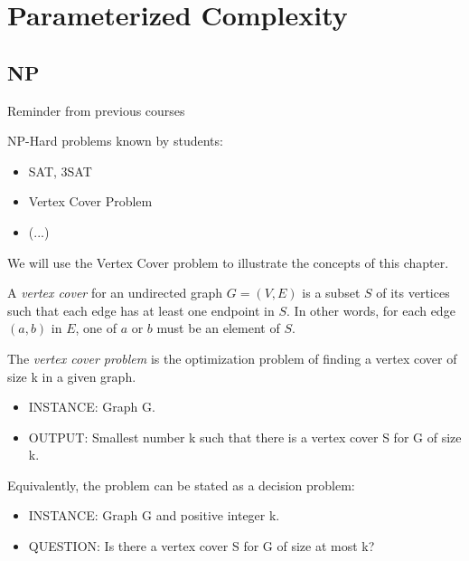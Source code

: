 
\chapter{Parameterized Complexity}
\label{cha:param-compl}



\section{NP}
\label{sec:np}

Reminder from previous courses


NP-Hard problems known by students:
\begin{itemize}
\item SAT, 3SAT

\item Vertex Cover Problem

\item (...)

\end{itemize}



We will use the Vertex Cover problem to illustrate the concepts of
this chapter.

\begin{definition}
  A \emph{vertex cover} for an undirected graph $G = (V,E)$ is a
  subset $S$ of its vertices such that each edge has at least one
  endpoint in $S$. 
%
  In other words, for each edge $(a,b)$ in $E$, one of $a$ or $b$ must
  be an element of $S$.
\end{definition}

\begin{definition}
The \emph{vertex cover problem} is the optimization problem of finding a vertex cover of size k in a given graph.
\begin{itemize}
\item INSTANCE: Graph G.
\item OUTPUT: Smallest number k such that there is a vertex cover S for G of size k.
\end{itemize}

Equivalently, the problem can be stated as a decision problem:
\begin{itemize}
\item INSTANCE: Graph G and positive integer k.
\item QUESTION: Is there a vertex cover S for G of size at most k?
\end{itemize}
  
\end{definition}

